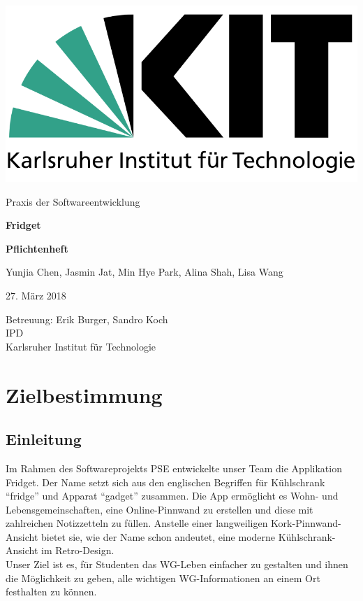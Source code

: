 \documentclass[a4paper]{scrreprt}
\begin{document}
    \begin{flushright}
        \includegraphics[scale = 0.2]{kit-logo.png}\\[0.5cm]
    \end{flushright}
    \vspace*{2cm}

    \begin{center} 
    		\large Praxis der Softwareentwicklung
        \vspace*{1.5cm}

        \textbf{\huge Fridget}
        \vspace*{1cm}

        \textbf{\Large Pflichtenheft}
        \vspace*{2cm}

        Yunjia Chen, Jasmin Jat, Min Hye Park, Alina Shah, Lisa Wang
        \vspace*{1cm}

        27. März 2018
        \vspace*{2.5cm}

        Betreuung: Erik Burger, Sandro Koch\\[0.5cm]
        IPD\\[0.5cm]

        Karlsruher Institut für Technologie
    \end{center}
    \thispagestyle{empty}

    \tableofcontents

    \chapter{Zielbestimmung}
    
    	\section{Einleitung}
    	Im Rahmen des Softwareprojekts PSE entwickelte unser Team die Applikation Fridget. Der Name setzt sich aus den englischen Begriffen für Kühlschrank ``fridge” und Apparat ``gadget” zusammen. Die App ermöglicht es Wohn- und Lebensgemeinschaften, eine Online-Pinnwand zu erstellen und diese mit zahlreichen Notizzetteln zu füllen. Anstelle einer langweiligen Kork-Pinnwand-Ansicht bietet sie, wie der Name schon andeutet, eine moderne Kühlschrank-Ansicht im Retro-Design.\\
    	Unser Ziel ist es, für Studenten das WG-Leben einfacher zu gestalten und ihnen die Möglichkeit zu geben, alle wichtigen WG-Informationen an einem Ort festhalten zu können.
    	
\end{document}
